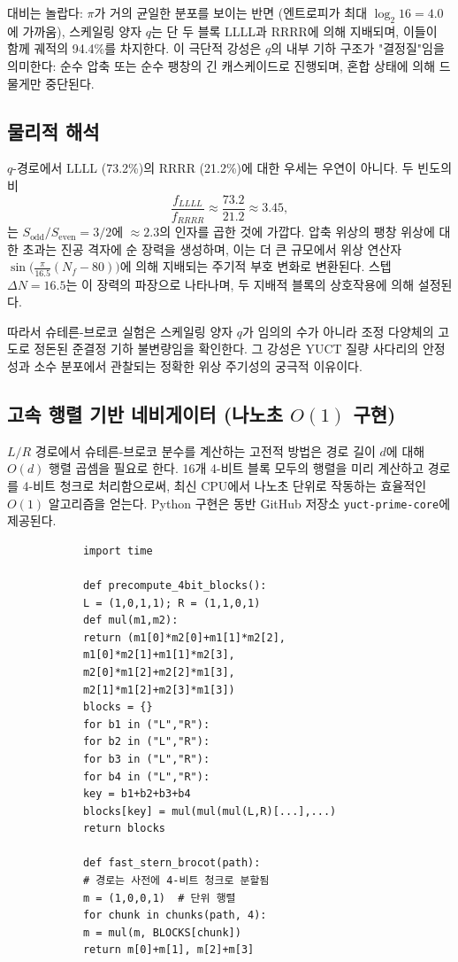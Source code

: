 \documentclass[11pt,a4paper]{article}
\begin{document}
	대비는 놀랍다: \(\pi\)가 거의 균일한 분포를 보이는 반면 (엔트로피가 최대 \(\log_2 16 = 4.0\)에 가까움), 스케일링 양자 \(q\)는 단 두 블록 LLLL과 RRRR에 의해 지배되며, 이들이 함께 궤적의 94.4\%를 차지한다. 이 극단적 강성은 \(q\)의 내부 기하 구조가 "결정질"임을 의미한다: 순수 압축 또는 순수 팽창의 긴 캐스케이드로 진행되며, 혼합 상태에 의해 드물게만 중단된다.
	
	\subsection{물리적 해석}
	
	\(q\)-경로에서 LLLL (73.2\%)의 RRRR (21.2\%)에 대한 우세는 우연이 아니다. 두 빈도의 비
	\[
	\frac{f_{LLLL}}{f_{RRRR}} \approx \frac{73.2}{21.2} \approx 3.45,
	\]
	는 \(S_{\mathrm{odd}}/S_{\mathrm{even}} = 3/2\)에 \(\approx 2.3\)의 인자를 곱한 것에 가깝다. 압축 위상의 팽창 위상에 대한 초과는 진공 격자에 순 장력을 생성하며, 이는 더 큰 규모에서 위상 연산자 \(\sin\!\bigl(\frac{\pi}{16.5}(N_f-80)\bigr)\)에 의해 지배되는 주기적 부호 변화로 변환된다. 스텝 \(\Delta N = 16.5\)는 이 장력의 파장으로 나타나며, 두 지배적 블록의 상호작용에 의해 설정된다.
	
	따라서 슈테른-브로코 실험은 스케일링 양자 \(q\)가 임의의 수가 아니라 조정 다양체의 고도로 정돈된 준결정 기하 불변량임을 확인한다. 그 강성은 YUCT 질량 사다리의 안정성과 소수 분포에서 관찰되는 정확한 위상 주기성의 궁극적 이유이다.
	
	\subsection{고속 행렬 기반 네비게이터 (나노초 \(O(1)\) 구현)}
	
	\(L/R\) 경로에서 슈테른-브로코 분수를 계산하는 고전적 방법은 경로 길이 \(d\)에 대해 \(O(d)\) 행렬 곱셈을 필요로 한다. 16개 4-비트 블록 모두의 행렬을 미리 계산하고 경로를 4-비트 청크로 처리함으로써, 최신 CPU에서 나노초 단위로 작동하는 효율적인 \(O(1)\) 알고리즘을 얻는다. Python 구현은 동반 GitHub 저장소 \texttt{yuct-prime-core}에 제공된다.
	
	\begin{tcolorbox}[title=4-비트 블록 네비게이터 (Python), breakable]
		\begin{lstlisting}
			import time
			
			def precompute_4bit_blocks():
			L = (1,0,1,1); R = (1,1,0,1)
			def mul(m1,m2):
			return (m1[0]*m2[0]+m1[1]*m2[2],
			m1[0]*m2[1]+m1[1]*m2[3],
			m2[0]*m1[2]+m2[2]*m1[3],
			m2[1]*m1[2]+m2[3]*m1[3])
			blocks = {}
			for b1 in ("L","R"):
			for b2 in ("L","R"):
			for b3 in ("L","R"):
			for b4 in ("L","R"):
			key = b1+b2+b3+b4
			blocks[key] = mul(mul(mul(L,R)[...],...)
			return blocks
			
			def fast_stern_brocot(path):
			# 경로는 사전에 4-비트 청크로 분할됨
			m = (1,0,0,1)  # 단위 행렬
			for chunk in chunks(path, 4):
			m = mul(m, BLOCKS[chunk])
			return m[0]+m[1], m[2]+m[3]
		\end{lstlisting}
	\end{tcolorbox}
	
\end{document}
